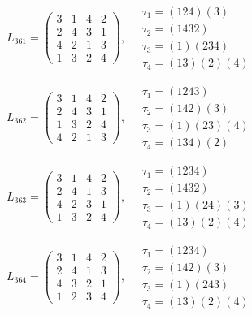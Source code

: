 $L_{361} = \begin{pmatrix} 3 & 1 & 4 & 2 \\ 2 & 4 & 3 & 1 \\ 4 & 2 & 1 & 3 \\ 1 & 3 & 2 & 4 \end{pmatrix}, \quad \begin{matrix} \tau_{1} = (1 2 4)(3) \\ \tau_{2} = (1 4 3 2) \\ \tau_{3} = (1)(2 3 4) \\ \tau_{4} = (1 3)(2)(4) \end{matrix}$

$L_{362} = \begin{pmatrix} 3 & 1 & 4 & 2 \\ 2 & 4 & 3 & 1 \\ 1 & 3 & 2 & 4 \\ 4 & 2 & 1 & 3 \end{pmatrix}, \quad \begin{matrix} \tau_{1} = (1 2 4 3) \\ \tau_{2} = (1 4 2)(3) \\ \tau_{3} = (1)(2 3)(4) \\ \tau_{4} = (1 3 4)(2) \end{matrix}$

$L_{363} = \begin{pmatrix} 3 & 1 & 4 & 2 \\ 2 & 4 & 1 & 3 \\ 4 & 2 & 3 & 1 \\ 1 & 3 & 2 & 4 \end{pmatrix}, \quad \begin{matrix} \tau_{1} = (1 2 3 4) \\ \tau_{2} = (1 4 3 2) \\ \tau_{3} = (1)(2 4)(3) \\ \tau_{4} = (1 3)(2)(4) \end{matrix}$

$L_{364} = \begin{pmatrix} 3 & 1 & 4 & 2 \\ 2 & 4 & 1 & 3 \\ 4 & 3 & 2 & 1 \\ 1 & 2 & 3 & 4 \end{pmatrix}, \quad \begin{matrix} \tau_{1} = (1 2 3 4) \\ \tau_{2} = (1 4 2)(3) \\ \tau_{3} = (1)(2 4 3) \\ \tau_{4} = (1 3)(2)(4) \end{matrix}$

